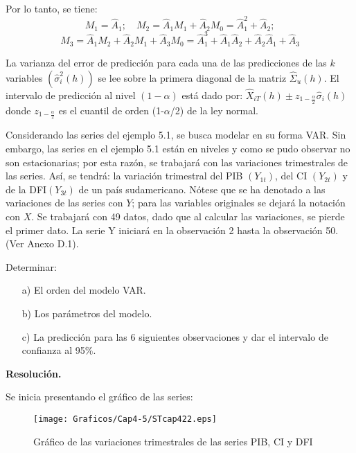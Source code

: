 Por lo tanto, se tiene:
\[
M_{1}=\hat{A}_{1};\quad M_{2}=\hat{A}_{1}M_{1}+\hat{A}_{2}M_{0}=\hat{A}_{1}^{2}+\hat{A}_{2};
\]
\[
M_{3}=\hat{A}_{1}M_{2}+\hat{A}_{2} M_{1}+\hat{A}_{3} M_{0}=\hat{A}_{1}^{3}+\hat{A}_{1}\hat{A}_{2}+\hat{A}_{2}\hat{A}_{1}+\hat{A}_{3}
\]

La varianza del error de predicci\'{o}n para cada una de las predicciones de las $k$ variables $\left( \hat{\sigma }_{i}^{2}(h) \right)$ se lee sobre la primera diagonal de la matriz $\hat{\Sigma }_{u}(h)$. El intervalo de predicci\'{o}n al nivel $(1-\alpha )$ est\'{a} dado por: $\hat{X}_{iT}\left( h \right)\pm z_{1-\frac{\alpha }{2}}\hat{\sigma}_{i}(h)$ donde $z_{1-\frac{\alpha }{2}}$ es el cuantil de orden (1-$\alpha $/2) de la ley normal.

\begin{ejemplo}
Considerando las series del ejemplo 5.1, se busca modelar en su forma VAR. Sin embargo, las series en el ejemplo 5.1 est\'{a}n 
en niveles y como se pudo observar no son estacionarias; por esta raz\'{o}n, se trabajar\'{a} con las variaciones trimestrales de las series. As\'{i}, se tendr\'{a}: la variaci\'{o}n trimestral del PIB $\left( Y_{1t} \right)$, del CI $\left( Y_{2t} \right)$ y de la DFI$\left( Y_{3t} \right)$ de un pa\'{i}s sudamericano. N\'{o}tese que se ha denotado a las variaciones de 
las series con $Y$; para las variables originales se dejar\'{a} la notaci\'{o}n con $X$. Se trabajar\'{a} con 49 datos, dado que al calcular las variaciones, se pierde el primer dato. La serie Y iniciar\'{a} en la observaci\'{o}n 2 hasta la observaci\'{o}n 50. (Ver Anexo D.1).\newline

Determinar:

\begin{enumerate}
\item[a)] El orden del modelo VAR.
\item[b)] Los par\'{a}metros del modelo.
\item[c)] La predicci\'{o}n para las 6 siguientes observaciones y dar el intervalo de confianza al 95$\%$.
\end{enumerate}
\end{ejemplo}


\textbf{Resoluci\'{o}n.}\newline

Se inicia presentando el gr\'{a}fico de las series:
\begin{figure}[H]
\centering
\texttt{[image: Graficos/Cap4-5/STcap422.eps]}
\caption{Gr\'{a}fico de las variaciones trimestrales de las series PIB, CI y DFI}
\label{fig22}
\end{figure}

